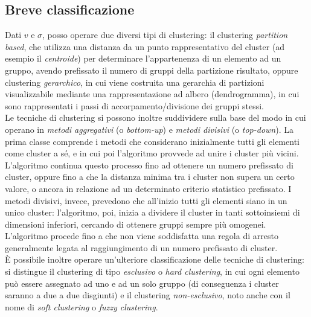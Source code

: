 \documentclass[oneside, openany]{book}
\begin{document}
		\subsection{Breve classificazione}
			Dati $v$ e $\sigma$, posso operare due diversi tipi di clustering: il clustering \textit{partition based}, che utilizza una distanza da un punto rappresentativo del cluster (ad esempio il \textit{centroide}) per determinare l'appartenenza di un elemento ad un gruppo, avendo prefissato il numero di gruppi della partizione risultato, oppure clustering \textit{gerarchico}, in cui viene costruita una gerarchia di partizioni visualizzabile mediante una rappresentazione ad albero (dendrogramma), in cui sono rappresentati i passi di accorpamento/divisione dei gruppi stessi.\\
			Le tecniche di clustering si possono inoltre suddividere sulla base del modo in cui operano in \textit{metodi aggregativi} (o \textit{bottom-up}) e \textit{metodi divisivi} (o \textit{top-down}). La prima classe comprende i metodi che considerano inizialmente tutti gli elementi come cluster a sé, e in cui poi l'algoritmo provvede ad unire i cluster più vicini. L'algoritmo continua questo processo fino ad ottenere un numero prefissato di cluster, oppure fino a che la distanza minima tra i cluster non supera un certo valore, o ancora in relazione ad un determinato criterio statistico prefissato.
			I metodi divisivi, invece, prevedono che all'inizio tutti gli elementi siano in un unico cluster: l'algoritmo, poi, inizia a dividere il cluster in tanti sottoinsiemi di dimensioni inferiori, cercando di ottenere gruppi sempre più omogenei. L'algoritmo procede fino a che non viene soddisfatta una regola di arresto generalmente legata al raggiungimento di un numero prefissato di cluster.\\
			\`E possibile inoltre operare un'ulteriore classificazione delle tecniche di clustering: si distingue il clustering di tipo \textit{esclusivo} o \textit{hard clustering}, in cui ogni elemento può essere assegnato ad uno e ad un solo gruppo (di conseguenza i cluster saranno a due a due disgiunti) e il clustering \textit{non-esclusivo}, noto anche con il nome di \textit{soft clustering} o \textit{fuzzy clustering}.
\end{document}
